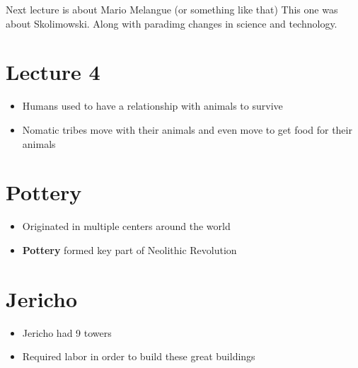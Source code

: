 \documentclass{article}
\begin{document}
Next lecture is about Mario Melangue (or something like that)
This one was about Skolimowski. Along with paradimg changes in
science and technology.

\newpage

\section{Lecture 4}

\begin{itemize}
  \item Humans used to have a relationship with animals
    to survive
  \item Nomatic tribes move with their animals and even
    move to get food for their animals
\end{itemize}


\section*{Pottery}
\begin{itemize}
  \item Originated in multiple centers around the world
  \item \textbf{Pottery} formed key part of Neolithic Revolution
\end{itemize}

\section*{Jericho}
\begin{itemize}
  \item Jericho had 9 towers
  \item Required labor in order to build these great
    buildings
\end{itemize}
\end{document}

